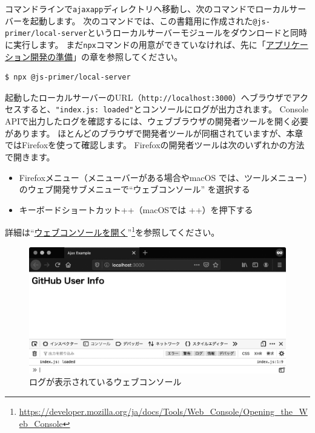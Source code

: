 コマンドラインで\texttt{ajaxapp}ディレクトリへ移動し、次のコマンドでローカルサーバーを起動します。
次のコマンドでは、この書籍用に作成された\texttt{@js-primer/local-server}というローカルサーバーモジュールをダウンロードと同時に実行します。
まだ\texttt{npx}コマンドの用意ができていなければ、先に「\hyperlink{setup-local-env}{アプリケーション開発の準備}」の章を参照してください。

\begin{lstlisting}
$ npx @js-primer/local-server
\end{lstlisting}

起動したローカルサーバーのURL（\texttt{http://localhost:3000}）へブラウザでアクセスすると、\texttt{"index.js: loaded"}とコンソールにログが出力されます。
Console
APIで出力したログを確認するには、ウェブブラウザの開発者ツールを開く必要があります。
ほとんどのブラウザで開発者ツールが同梱されていますが、本章ではFirefoxを使って確認します。
Firefoxの開発者ツールは次のいずれかの方法で開きます。

\begin{itemize}
\item
  Firefoxメニュー（メニューバーがある場合やmacOS
  では、ツールメニュー）のウェブ開発サブメニューで``ウェブコンソール''
  を選択する
\item
  キーボードショートカット++（macOSでは
  ++）を押下する
\end{itemize}

詳細は``\href{https://developer.mozilla.org/ja/docs/Tools/Web_Console/Opening_the_Web_Console}{ウェブコンソールを開く}''\footnote{\url{https://developer.mozilla.org/ja/docs/Tools/Web_Console/Opening_the_Web_Console}}を参照してください。

\begin{figure}[h]
\centering
\includegraphics[width=120mm]{fig/fig-1.eps}
\caption{ログが表示されているウェブコンソール}
\end{figure}

